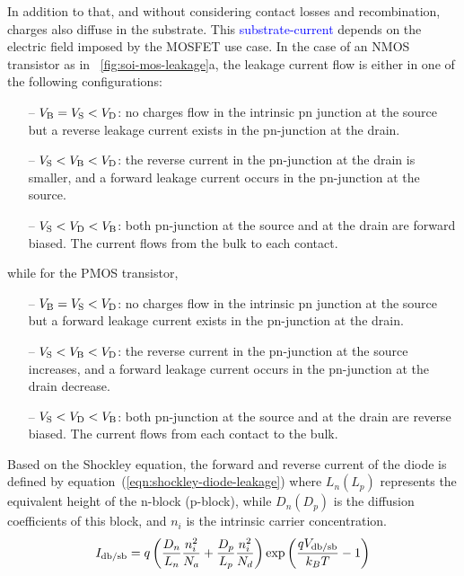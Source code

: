 In addition to that, and without considering contact losses and recombination, charges also diffuse in the substrate. This \textcolor{blue}{substrate-current} depends on the electric field imposed by the MOSFET use case. In the case of an NMOS transistor as in \figurename~\ref{fig:soi-mos-leakage}a, the leakage current flow is either in one of the following configurations:
\begin{itemize}
	\item[--] $V_{\rm B} = V_{\rm S} < V_{\rm D}$: no charges flow in the intrinsic pn junction at the source but a reverse leakage current exists in the pn-junction at the drain.
	\item[--] $V_{\rm S} < V_{\rm B} < V_{\rm D}$: the reverse current in the pn-junction at the drain is smaller, and a forward leakage current occurs in the pn-junction at the source.
	\item[--] $V_{\rm S} < V_{\rm D} < V_{\rm B}$: both pn-junction at the source and at the drain are forward biased. The current flows from the bulk to each contact.
\end{itemize}

while for the PMOS transistor,
\begin{itemize}
	\item[--] $V_{\rm B} = V_{\rm S} < V_{\rm D}$: no charges flow in the intrinsic pn junction at the source but a forward leakage current exists in the pn-junction at the drain.
	\item[--] $V_{\rm S} < V_{\rm B} < V_{\rm D}$: the reverse current in the pn-junction at the source increases, and a forward leakage current occurs in the pn-junction at the drain decrease.
	\item[--] $V_{\rm S} < V_{\rm D} < V_{\rm B}$: both pn-junction at the source and at the drain are reverse biased. The current flows from each contact to the bulk.
\end{itemize}

Based on the Shockley equation, the forward and reverse current of the diode is defined by equation~(\ref{eqn:shockley-diode-leakage}) where $L_n (L_p)$ represents the equivalent height of the n-block (p-block), while $D_n (D_p)$ is the diffusion coefficients of this block, and $n_i$ is the intrinsic carrier concentration.
\begin{equation}
\label{eqn:shockley-diode-leakage}
I_{\rm db/sb} = q\left(\frac{D_n}{L_n}\frac{n_i^2}{N_a}+\frac{D_p}{L_p}\frac{n_i^2}{N_d}\right) \exp\left(\frac{qV_{\rm db/sb}}{k_BT} - 1\right)
\end{equation}

